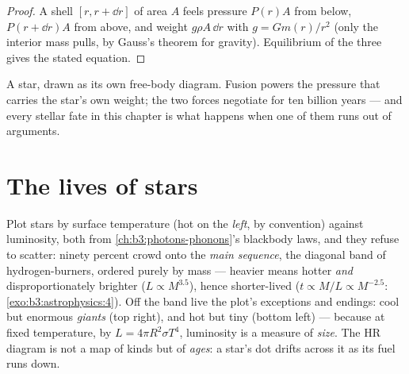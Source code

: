 \begin{proof}
A shell $[r, r + \dd r]$ of area $A$ feels pressure $P(r)A$ from
below, $P(r + \dd r)A$ from above, and weight $g\rho A\,\dd r$
with $g = Gm(r)/r^2$ (only the interior mass pulls, by Gauss's
theorem for gravity). Equilibrium of the three gives the stated
equation.
\end{proof}

\begin{omfigure}

{\small A star, drawn as its own free-body diagram. Fusion powers
the pressure that carries the star's own weight; the two forces
negotiate for ten billion years --- and every stellar fate in this
chapter is what happens when one of them runs out of arguments.}
\end{omfigure}

\section{The lives of stars}

\begin{definition}\label{def:b3:astrophysics:hr}
Plot stars by surface temperature (hot on the \emph{left}, by
convention) against luminosity, both from
\cref{ch:b3:photons-phonons}'s blackbody laws, and they refuse to
scatter: ninety percent crowd onto the \emph{main sequence}, the
diagonal band of hydrogen-burners, ordered purely by mass ---
heavier means hotter \emph{and} disproportionately brighter
($L \propto M^{3.5}$), hence shorter-lived
($t \propto M/L \propto M^{-2.5}$:
\cref{exo:b3:astrophysics:4}). Off the band live the
plot's exceptions and endings: cool but enormous \emph{giants}
(top right), and hot but tiny \emph{} (bottom left)
--- because at fixed temperature, by $L = 4\pi R^2\sigma T^4$,
luminosity is a measure of \emph{size}. The HR diagram is not a
map of kinds but of \emph{ages}: a star's dot drifts across it as
its fuel runs down.
\end{definition}

